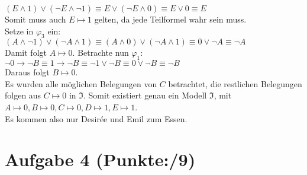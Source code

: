 \documentclass[11pt, a4paper]{article}
\newcommand{\pp}{9}
\newcommand{\interpretation}[1] {\mathfrak{#1}}
\begin{document}
\begin{adjustwidth}{20pt}{20pt}
$(E\wedge 1)\vee(\neg E\wedge \neg 1) \equiv E \vee (\neg E\wedge 0) \equiv E\vee 0 \equiv E$\\

Somit muss auch $E\mapsto 1$ gelten, da jede Teilformel wahr sein muss.\\
Setze in $\varphi_3$ ein:\\

$(A\wedge\neg 1)\vee(\neg A \wedge 1)\equiv (A\wedge 0)\vee(\neg A \wedge 1) \equiv 0 \vee \neg A \equiv \neg A$\\

Damit folgt $A\mapsto 0$. Betrachte nun $\varphi_1$:\\

$\neg 0 \rightarrow  \neg B \equiv 1 \rightarrow  \neg B \equiv \neg 1 \vee \neg B \equiv 0 \vee \neg B  \equiv \neg B$\\

Daraus folgt $B\mapsto 0$.\\

Es wurden alle möglichen Belegungen von $C$ betrachtet, die restlichen Belegungen folgen aus $C\mapsto 0$ in $\interpretation{I}$. Somit existiert genau ein Modell $\interpretation{I}$, mit $A\mapsto 0, B \mapsto 0, C \mapsto 0, D \mapsto 1, E\mapsto 1$.\\

Es kommen also nur Desir\'{e}e und Emil zum Essen.


\end{adjustwidth}




\section*{Aufgabe 4 (Punkte:\qquad/\pp)}
\end{document}
